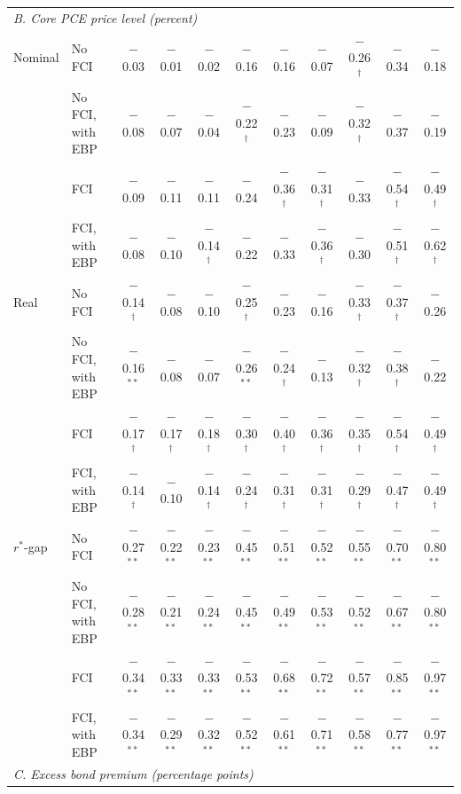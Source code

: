 \begin{tabular}{llccccccccc}
\midrule
\multicolumn{11}{l}{\textit{B. Core PCE price level (percent)}}\\
Nominal & No FCI & $-$0.03 & $-$0.01 & $-$0.02 & $-$0.16 & $-$0.16 & $-$0.07 & $-$0.26$^{\dagger}$ & $-$0.34 & $-$0.18 \\
 & No FCI, with EBP & $-$0.08 & $-$0.07 & $-$0.04 & $-$0.22$^{\dagger}$ & $-$0.23 & $-$0.09 & $-$0.32$^{\dagger}$ & $-$0.37 & $-$0.19 \\
 & FCI & $-$0.09 & $-$0.11 & $-$0.11 & $-$0.24 & $-$0.36$^{\dagger}$ & $-$0.31$^{\dagger}$ & $-$0.33 & $-$0.54$^{\dagger}$ & $-$0.49$^{\dagger}$ \\
 & FCI, with EBP & $-$0.08 & $-$0.10 & $-$0.14$^{\dagger}$ & $-$0.22 & $-$0.33 & $-$0.36$^{\dagger}$ & $-$0.30 & $-$0.51$^{\dagger}$ & $-$0.62$^{\dagger}$ \\
Real & No FCI & $-$0.14$^{\dagger}$ & $-$0.08 & $-$0.10 & $-$0.25$^{\dagger}$ & $-$0.23 & $-$0.16 & $-$0.33$^{\dagger}$ & $-$0.37$^{\dagger}$ & $-$0.26 \\
 & No FCI, with EBP & $-$0.16$^{**}$ & $-$0.08 & $-$0.07 & $-$0.26$^{**}$ & $-$0.24$^{\dagger}$ & $-$0.13 & $-$0.32$^{\dagger}$ & $-$0.38$^{\dagger}$ & $-$0.22 \\
 & FCI & $-$0.17$^{\dagger}$ & $-$0.17$^{\dagger}$ & $-$0.18$^{\dagger}$ & $-$0.30$^{\dagger}$ & $-$0.40$^{\dagger}$ & $-$0.36$^{\dagger}$ & $-$0.35$^{\dagger}$ & $-$0.54$^{\dagger}$ & $-$0.49$^{\dagger}$ \\
 & FCI, with EBP & $-$0.14$^{\dagger}$ & $-$0.10 & $-$0.14$^{\dagger}$ & $-$0.24$^{\dagger}$ & $-$0.31$^{\dagger}$ & $-$0.31$^{\dagger}$ & $-$0.29$^{\dagger}$ & $-$0.47$^{\dagger}$ & $-$0.49$^{\dagger}$ \\
$r^*$-gap & No FCI & $-$0.27$^{**}$ & $-$0.22$^{**}$ & $-$0.23$^{**}$ & $-$0.45$^{**}$ & $-$0.51$^{**}$ & $-$0.52$^{**}$ & $-$0.55$^{**}$ & $-$0.70$^{**}$ & $-$0.80$^{**}$ \\
 & No FCI, with EBP & $-$0.28$^{**}$ & $-$0.21$^{**}$ & $-$0.24$^{**}$ & $-$0.45$^{**}$ & $-$0.49$^{**}$ & $-$0.53$^{**}$ & $-$0.52$^{**}$ & $-$0.67$^{**}$ & $-$0.80$^{**}$ \\
 & FCI & $-$0.34$^{**}$ & $-$0.33$^{**}$ & $-$0.33$^{**}$ & $-$0.53$^{**}$ & $-$0.68$^{**}$ & $-$0.72$^{**}$ & $-$0.57$^{**}$ & $-$0.85$^{**}$ & $-$0.97$^{**}$ \\
 & FCI, with EBP & $-$0.34$^{**}$ & $-$0.29$^{**}$ & $-$0.32$^{**}$ & $-$0.52$^{**}$ & $-$0.61$^{**}$ & $-$0.71$^{**}$ & $-$0.58$^{**}$ & $-$0.77$^{**}$ & $-$0.97$^{**}$ \\
\midrule
\multicolumn{11}{l}{\textit{C. Excess bond premium (percentage points)}}\\

\end{tabular}
